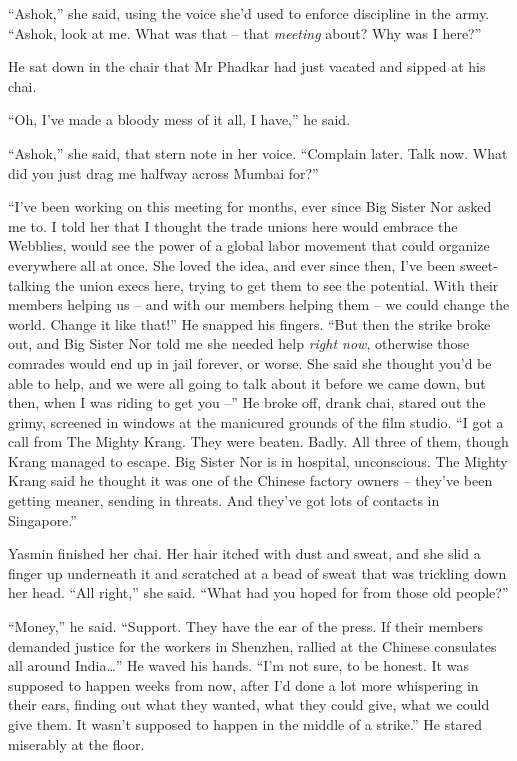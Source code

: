 ``Ashok,'' she said, using the voice she'd used to enforce discipline
in the army. ``Ashok, look at me. What was that -- that
\emph{meeting} about? Why was I here?''

He sat down in the chair that Mr Phadkar had just vacated and
sipped at his chai.

``Oh, I've made a bloody mess of it all, I have,'' he said.

``Ashok,'' she said, that stern note in her voice. ``Complain later.
Talk now. What did you just drag me halfway across Mumbai for?''

``I've been working on this meeting for months, ever since Big
Sister Nor asked me to. I told her that I thought the trade unions
here would embrace the Webblies, would see the power of a global
labor movement that could organize everywhere all at once. She
loved the idea, and ever since then, I've been sweet-talking the
union execs here, trying to get them to see the potential. With
their members helping us -- and with our members helping them -- we
could change the world. Change it like that!'' He snapped his
fingers. ``But then the strike broke out, and Big Sister Nor told me
she needed help \emph{right now}, otherwise those comrades would
end up in jail forever, or worse. She said she thought you'd be
able to help, and we were all going to talk about it before we came
down, but then, when I was riding to get you --'' He broke off,
drank chai, stared out the grimy, screened in windows at the
manicured grounds of the film studio. ``I got a call from The Mighty
Krang. They were beaten. Badly. All three of them, though Krang
managed to escape. Big Sister Nor is in hospital, unconscious. The
Mighty Krang said he thought it was one of the Chinese factory
owners -- they've been getting meaner, sending in threats. And
they've got lots of contacts in Singapore.''

Yasmin finished her chai. Her hair itched with dust and sweat, and
she slid a finger up underneath it and scratched at a bead of sweat
that was trickling down her head. ``All right,'' she said. ``What had
you hoped for from those old people?''

``Money,'' he said. ``Support. They have the ear of the press. If
their members demanded justice for the workers in Shenzhen, rallied
at the Chinese consulates all around India\ldots{}'' He waved his hands.
``I'm not sure, to be honest. It was supposed to happen weeks from
now, after I'd done a lot more whispering in their ears, finding
out what they wanted, what they could give, what we could give
them. It wasn't supposed to happen in the middle of a strike.'' He
stared miserably at the floor.

